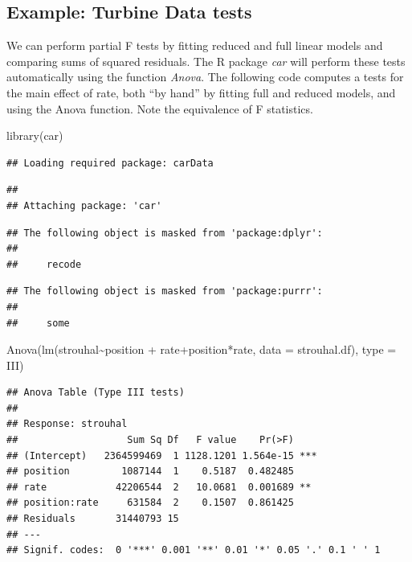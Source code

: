 \documentclass[
]{book}
\newenvironment{Shaded}{\begin{snugshade}}{\end{snugshade}}
\newcommand{\AttributeTok}[1]{\textcolor[rgb]{0.77,0.63,0.00}{#1}}
\newcommand{\FunctionTok}[1]{\textcolor[rgb]{0.00,0.00,0.00}{#1}}
\newcommand{\NormalTok}[1]{#1}
\newcommand{\SpecialCharTok}[1]{\textcolor[rgb]{0.00,0.00,0.00}{#1}}
\newcommand{\StringTok}[1]{\textcolor[rgb]{0.31,0.60,0.02}{#1}}
\begin{document}
\hypertarget{example-turbine-data-tests}{%
\subsection{Example: Turbine Data tests}\label{example-turbine-data-tests}}

We can perform partial F tests by fitting reduced and full linear models and comparing sums of squared residuals. The R package \emph{car} will perform these tests automatically using the function \emph{Anova}. The following code computes a tests for the main effect of rate, both ``by hand'' by fitting full and reduced models, and using the Anova function. Note the equivalence of F statistics.

\begin{Shaded}
\begin{Highlighting}[]
\FunctionTok{library}\NormalTok{(car)}
\end{Highlighting}
\end{Shaded}

\begin{verbatim}
## Loading required package: carData
\end{verbatim}

\begin{verbatim}
## 
## Attaching package: 'car'
\end{verbatim}

\begin{verbatim}
## The following object is masked from 'package:dplyr':
## 
##     recode
\end{verbatim}

\begin{verbatim}
## The following object is masked from 'package:purrr':
## 
##     some
\end{verbatim}

\begin{Shaded}
\begin{Highlighting}[]
\FunctionTok{Anova}\NormalTok{(}\FunctionTok{lm}\NormalTok{(strouhal}\SpecialCharTok{\textasciitilde{}}\NormalTok{position }\SpecialCharTok{+}\NormalTok{ rate}\SpecialCharTok{+}\NormalTok{position}\SpecialCharTok{*}\NormalTok{rate, }\AttributeTok{data =}\NormalTok{ strouhal.df), }\AttributeTok{type =} \StringTok{\textquotesingle{}III\textquotesingle{}}\NormalTok{)}
\end{Highlighting}
\end{Shaded}

\begin{verbatim}
## Anova Table (Type III tests)
## 
## Response: strouhal
##                   Sum Sq Df   F value    Pr(>F)    
## (Intercept)   2364599469  1 1128.1201 1.564e-15 ***
## position         1087144  1    0.5187  0.482485    
## rate            42206544  2   10.0681  0.001689 ** 
## position:rate     631584  2    0.1507  0.861425    
## Residuals       31440793 15                        
## ---
## Signif. codes:  0 '***' 0.001 '**' 0.01 '*' 0.05 '.' 0.1 ' ' 1
\end{verbatim}
\end{document}
